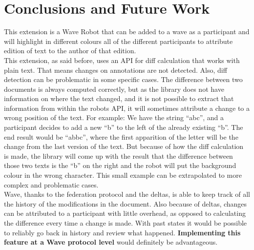 \section{Conclusions and Future Work}
This extension is a Wave Robot that can be added to a wave as a participant and will highlight in different colours all of the different participants to attribute edition of text to the author of that edition.\\[.2cm]
This extension, as said before, uses an API for diff calculation that works with plain text. That means changes on annotations are not detected. Also, diff detection can be problematic in some specific cases. The difference between two documents is always computed correctly, but as the library does not have information on where the text changed, and it is not possible to extract that information from within the robots API, it will sometimes attribute a change to a wrong position of the text. For example: We have the string ``abc'', and a participant decides to add a new ``b'' to the left of the already existing ``b''. The end result would be ``abbc'', where the first apparition of the letter will be the change from the last version of the text. But because of how the diff calculation is made, the library will come up with the result that the difference between those two texts is the ``b'' on the right and the robot will put the background colour in the wrong character. This small example can be extrapolated to more complex and problematic cases.\\[.2cm]
Wave, thanks to the federation protocol and the deltas, is able to keep track of all the history of the modifications in the document. Also because of deltas, changes can be attributed to a participant with little overhead, as opposed to calculating the difference every time a change is made. With past states it would be possible to reliably go back in history and review what happened. \textbf{Implementing this feature at a Wave protocol level} would definitely be advantageous.
